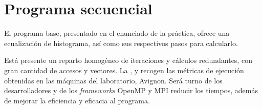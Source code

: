 \section{Programa secuencial}
El programa base, presentado en el enunciado de la práctica, ofrece una ecualización de histograma, así como sus respectivos pasos para calcularlo.

Está presente un reparto homogéneo de iteraciones y cálculos redundantes, con gran cantidad de accesos y vectores. La ,  y  recogen las métricas de ejecución obtenidas en las máquinas del laboratorio, Avignon.
Será turno de los desarrolladores y de los \textit{frameworks} OpenMP y MPI reducir los tiempos, además de mejorar la eficiencia y eficacia al programa.

\newpage
{}
